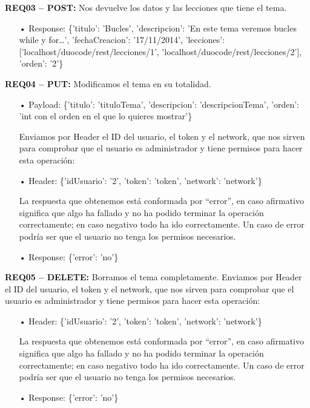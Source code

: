 \textbf{REQ03 – POST:} Nos devuelve los datos y las lecciones que tiene el tema.

\begin{itemize}
\item[•]Response:
\{'titulo': 'Bucles', 'descripcion': 'En este tema veremos bucles while y for…', 'fechaCreacion': '17/11/2014', 'lecciones': ['localhost/duocode/rest/lecciones/1', 'localhost/duocode/rest/lecciones/2'], 'orden': '2'\}
\end{itemize}

\textbf{REQ04 – PUT:} Modificamos el tema en su totalidad.
\begin{itemize}
\item[•]Payload:
\{'titulo': 'tituloTema', 'descripcion': 'descripcionTema', 'orden': 'int con el orden en el que lo quieres mostrar'\}
\vspace{1em}

Enviamos por Header el ID del usuario, el token y el network, que nos sirven para comprobar que el usuario es administrador y tiene permisos para hacer esta operación:

\item[•]Header: 
\{'idUsuario': '2', 'token': 'token', 'network': 'network'\}
\vspace{1em}

La respuesta que obtenemos está conformada por “error”, en caso afirmativo significa que algo ha fallado y no ha podido terminar la operación correctamente; en caso negativo todo ha ido correctamente. Un caso de error podría ser que el usuario no tenga los permisos necesarios.
\item[•]Response: 
\{'error': 'no'\}
\end{itemize}

\textbf{REQ05 – DELETE:} Borramos el tema completamente. Enviamos por Header el ID del usuario, el token y el network, que nos sirven para comprobar que el usuario es administrador y tiene permisos para hacer esta operación:
\begin{itemize}
\item[•]Header:
\{'idUsuario': '2', 'token': 'token', 'network': 'network'\}
\vspace{1em}

La respuesta que obtenemos está conformada por “error”, en caso afirmativo significa que algo ha fallado y no ha podido terminar la operación correctamente; en caso negativo todo ha ido correctamente. Un caso de error podría ser que el usuario no tenga los permisos necesarios.
\item[•]Response: 
\{'error': 'no'\}
\end{itemize}

